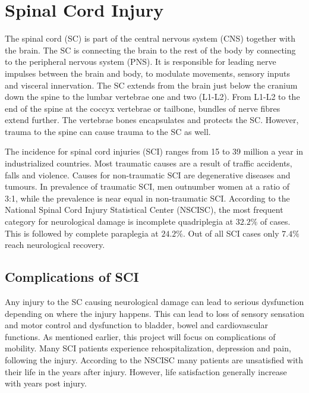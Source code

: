 
\section{Spinal Cord Injury}

The spinal cord (SC) is part of the central nervous system (CNS) together with the brain. The SC is connecting the brain to the rest of the body by connecting to the peripheral nervous system (PNS). It is responsible for leading nerve impulses between the brain and body, to modulate movements, sensory inputs and visceral innervation. The SC extends from the brain just below the cranium down the spine to the lumbar vertebrae one and two (L1-L2). From L1-L2 to the end of the spine at the coccyx vertebrae or tailbone, bundles of nerve fibres extend further. The vertebrae bones encapsulates and protects the SC. However, trauma to the spine can cause trauma to the SC as well. \cite{Weidner2017}

The incidence for spinal cord injuries (SCI) ranges from 15 to 39 million a year in industrialized countries. Most traumatic causes are a result of traffic accidents, falls and violence. Causes for non-traumatic SCI are degenerative diseases and tumours. In prevalence of traumatic SCI, men outnumber women at a ratio of 3:1, while the prevalence is near equal in non-traumatic SCI. According to the National Spinal Cord Injury Statistical Center (NSCISC), the most frequent category for neurological damage is incomplete quadriplegia at $32.2\%$ of cases. This is followed by complete paraplegia at $24.2\%$. Out of all SCI cases only $7.4\%$ reach neurological recovery. \cite{NSCISC2017} %

\subsection{Complications of SCI}
Any injury to the SC causing neurological damage can lead to serious dysfunction depending on where the injury happens. This can lead to loss of sensory sensation and motor control and dysfunction to bladder, bowel and cardiovascular functions. \cite{Weidner2017,Zehr2011} As mentioned earlier, this project will focus on complications of mobility.
Many SCI patients experience rehospitalization, depression and pain, following the injury. According to the NSCISC many patients are unsatisfied with their life in the years after injury. However, life satisfaction generally increase with years post injury. \cite{NSCISC2017} 